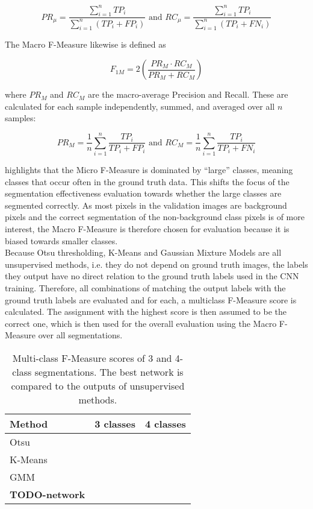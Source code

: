 \[ PR_\mu = \frac{\sum_{i=1}^{n} TP_i}{\sum_{i=1}^{n} (TP_i + FP_i)} \text{ and }  RC_\mu = \frac{\sum_{i=1}^{n} TP_i}{\sum_{i=1}^{n} (TP_i + FN_i)} \]

\noindent The Macro F-Measure likewise is defined as

\[ F_{1M} = 2 \left ( \frac{PR_M \cdot RC_M}{PR_M + RC_M} \right ) \]

\noindent where $PR_M$ and $RC_M$ are the macro-average Precision and Recall. These are calculated for each sample independently, summed, and averaged over all $n$ samples:

\[ PR_M = \frac{1}{n} \sum_{i=1}^{n} \frac{TP_i}{TP_i + FP_i} \text { and } RC_M = \frac{1}{n} \sum_{i=1}^{n} \frac{TP_i}{TP_i + FN_i} \] 

\noindent \cite[pp. 317-318]{information_retrieval} highlights that the Micro F-Measure is dominated by ``large'' classes, meaning classes that occur often in the ground truth data. This shifts the focus of the segmentation effectiveness evaluation towards whether the large classes are segmented correctly. As most pixels in the validation images are background pixels and the correct segmentation of the non-background class pixels is of more interest, the Macro F-Measure is therefore chosen for evaluation because it is biased towards smaller classes.\\

\noindent Because Otsu thresholding, K-Means and Gaussian Mixture Models are all unsupervised methods, i.e. they do not depend on ground truth images, the labels they output have no direct relation to the ground truth labels used in the CNN training. Therefore, all combinations of matching the output labels with the ground truth labels are evaluated and for each, a multiclass F-Measure score is calculated. The assignment with the highest score is then assumed to be the correct one, which is then used for the overall evaluation using the Macro F-Measure over all segmentations.


\begin {table}
	\centering
	\begin {tabular}[!ht]{|l|c|c|}
		\hline
		\textbf{Method}& \textbf{3 classes}& \textbf{4 classes}\\ \hline
		Otsu& & \\ \hline
		K-Means& & \\ \hline
		GMM& & \\ \hline
		\textbf{TODO-network}& & \\ \hline
	\end {tabular}
\caption[]{Multi-class F-Measure scores of 3 and 4-class segmentations. The best network is compared to the outputs of unsupervised methods.}
\end {table}